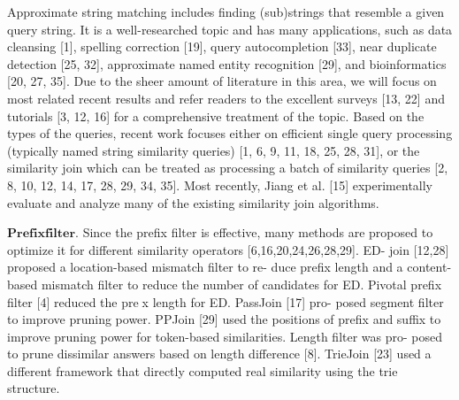 Approximate string matching includes finding (sub)strings
that resemble a given query string. It is a well-researched
topic and has many applications, such as data cleansing [1],
spelling correction [19], query autocompletion [33], near duplicate
detection [25, 32], approximate named entity recognition
[29], and bioinformatics [20, 27, 35].
Due to the sheer amount of literature in this area, we will
focus on most related recent results and refer readers to the
excellent surveys [13, 22] and tutorials [3, 12, 16] for a comprehensive
treatment of the topic.
Based on the types of the queries, recent work focuses either
on efficient single query processing (typically named string
similarity queries) [1, 6, 9, 11, 18, 25, 28, 31], or the similarity
join which can be treated as processing a batch of similarity
queries [2, 8, 10, 12, 14, 17, 28, 29, 34, 35]. Most recently,
Jiang et al. [15] experimentally evaluate and analyze many of
the existing similarity join algorithms.


$\mathbf{Prefix filter.}$ Since the prefix
filter is effective, many methods are proposed to optimize it
for different similarity operators [6,16,20,24,26,28,29]. ED-
join [12,28] proposed a location-based mismatch filter to re-
duce prefix length and a content-based mismatch filter to
reduce the number of candidates for ED. Pivotal prefix filter [4] reduced the prex length for ED. PassJoin [17] pro-
posed segment filter to improve pruning power. PPJoin [29]
used the positions of prefix and suffix to improve pruning
power for token-based similarities. Length filter was pro-
posed to prune dissimilar answers based on length difference [8]. TrieJoin [23] used a different framework that directly computed real similarity using the trie structure.



